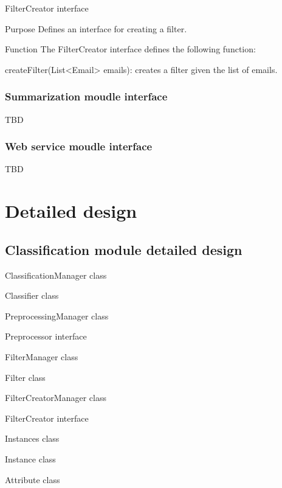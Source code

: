 \documentclass[12pt]{article}
\newenvironment{my_itemize}
{\begin{itemize}
  \setlength{\itemsep}{0cm}
  \setlength{\parskip}{0cm}}
{\end{itemize}}
\newenvironment{my_desc}
{\begin{description}
  \setlength{\itemsep}{0cm}
  \setlength{\parskip}{0cm}}
{\end{description}}
\begin{document}
\begin{my_itemize}
  \item FilterCreator interface
  \begin{my_desc}
   \item[Purpose] Defines an interface for creating a filter.
   \item[Function] The FilterCreator interface defines the following function:
	\begin{my_itemize}
	\item createFilter(List<Email> emails): creates a filter given the list of emails.
	\end{my_itemize}
  \end{my_desc}

\end{my_itemize}

\subsubsection{Summarization moudle interface}
TBD

\subsubsection{Web service moudle interface}
TBD

\section{Detailed design}

\subsection{Classification module detailed design}

\begin{my_itemize}
  \item ClassificationManager class
  \item Classifier class
  \item PreprocessingManager class
  \item Preprocessor interface
  \item FilterManager class
  \item Filter class
  \item FilterCreatorManager class
  \item FilterCreator interface
  \item Instances class
  \item Instance class
  \item Attribute class
\end{my_itemize}
\end{document}
